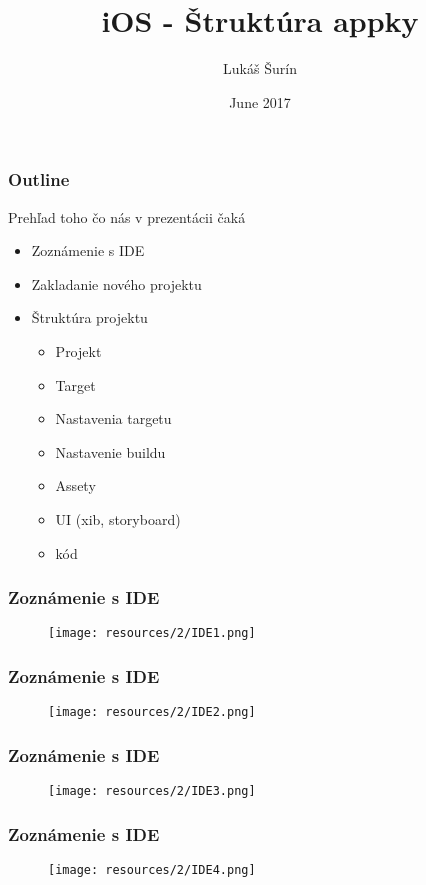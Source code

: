 \documentclass[serif,mathserif]{beamer}
\author[Lukáš Šurín]{Lukáš Šurín}
\title[Štruktúra appky\hspace{2em}\insertframenumber/\inserttotalframenumber]{iOS - Štruktúra appky }
\date{June 2017}
\institute{Profinit}
\begin{document}
\maketitle

\begin{frame}
  \frametitle{Outline}
  Prehľad toho čo nás v prezentácii čaká\pause
  \begin{itemize}
  \item Zoznámenie s IDE\pause
  \item Zakladanie nového projektu\pause
  \item Štruktúra projektu\pause
   \begin{itemize}
      \item Projekt\pause
      \item Target\pause
      \item Nastavenia targetu\pause
      \item Nastavenie buildu\pause
      \item Assety\pause
      \item UI (xib, storyboard)\pause
      \item kód\pause
  \end{itemize}
  \end{itemize}
\end{frame}

\begin{frame}
  \frametitle{Zoznámenie s IDE}
 \begin{figure}[h]
	\texttt{[image: resources/2/IDE1.png]}
  \end{figure}
\end{frame}

\begin{frame}
  \frametitle{Zoznámenie s IDE}
 \begin{figure}[h]
	\texttt{[image: resources/2/IDE2.png]}
  \end{figure}
\end{frame}

\begin{frame}
  \frametitle{Zoznámenie s IDE}
 \begin{figure}[h]
	\texttt{[image: resources/2/IDE3.png]}
  \end{figure}
\end{frame}

\begin{frame}
  \frametitle{Zoznámenie s IDE}
 \begin{figure}[h]
	\texttt{[image: resources/2/IDE4.png]}
  \end{figure}
\end{frame}
\end{document}
